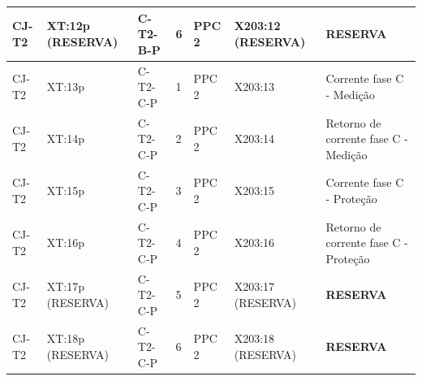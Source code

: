 \documentclass[11pt,a4paper]{article}
\newcommand{\res}{\textbf{RESERVA}}
\begin{document}
\begin{landscape}
\begin{longtable}{@{}L{2.5cm}L{2.4cm}L{2.8cm}L{0.85cm}L{2.4cm}L{2.6cm}L{9.5cm}@{}}
CJ-T2 & XT:12p (RESERVA) & C-T2-B-P & 6 & PPC 2 & X203:12 (RESERVA) & \res{}\\
\midrule
CJ-T2 & XT:13p & C-T2-C-P & 1 & PPC 2 & X203:13 & Corrente fase C - Medição\\
CJ-T2 & XT:14p & C-T2-C-P & 2 & PPC 2 & X203:14 & Retorno de corrente fase C - Medição\\
CJ-T2 & XT:15p & C-T2-C-P & 3 & PPC 2 & X203:15 & Corrente fase C - Proteção\\
CJ-T2 & XT:16p & C-T2-C-P & 4 & PPC 2 & X203:16 & Retorno de corrente fase C - Proteção\\
CJ-T2 & XT:17p (RESERVA) & C-T2-C-P & 5 & PPC 2 & X203:17 (RESERVA) & \res{}\\
CJ-T2 & XT:18p (RESERVA) & C-T2-C-P & 6 & PPC 2 & X203:18 (RESERVA) & \res{}\\
\end{longtable}\endgroup\end{landscape}
\end{document}
